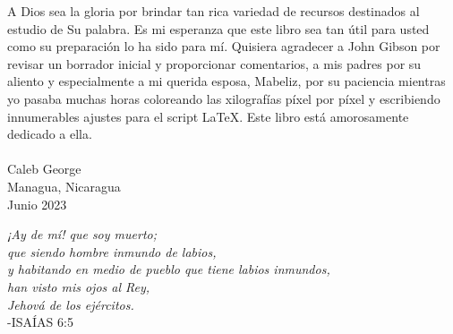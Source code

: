 A Dios sea la gloria por brindar tan rica variedad de recursos destinados al estudio de Su palabra. Es mi esperanza que este libro sea tan útil para usted como su preparación lo ha sido para mí. Quisiera agradecer a John Gibson por revisar un borrador inicial y proporcionar comentarios, a mis padres por su aliento y especialmente a mi querida esposa, Mabeliz, por su paciencia mientras yo pasaba muchas horas coloreando las xilografías píxel por píxel y escribiendo innumerables ajustes para el script \LaTeX{}. Este libro está amorosamente dedicado a ella.\\
\\
Caleb George\\
Managua, Nicaragua\\
Junio 2023
\clearpage

\cleartorecto
\begin{vplace}
\begin{center}
\textit{
¡Ay de mí! que soy muerto; \\
que siendo hombre inmundo de labios, \\
y habitando en medio de pueblo que tiene labios inmundos, \\
han visto mis ojos al Rey, \\
Jehová de los ejércitos.} \\
-ISAÍAS 6:5
\end{center}
\end{vplace}

\ClearShipoutPicture